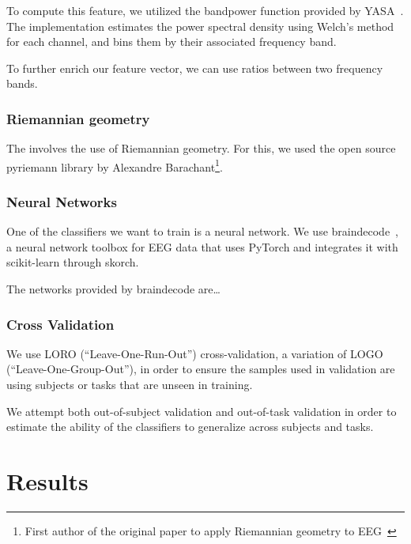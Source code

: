 \documentclass[a4paper]{article}
\begin{document}
\begin{refsection}
                To compute this feature, we utilized the bandpower function provided by YASA~\cite{raphael_vallat_raphaelvallatyasa_2020}. The implementation estimates the power spectral density using Welch's method for each channel, and bins them by their associated frequency band.

                To further enrich our feature vector, we can use ratios between two frequency bands.

            \subsubsection{Riemannian geometry}

                The  involves the use of Riemannian geometry. For this, we used the open source pyriemann library by Alexandre Barachant\footnote{First author of the original paper to apply Riemannian geometry to EEG~\cite{barachant_classification_2013}}.

        \subsubsection{Neural Networks}

            One of the classifiers we want to train is a neural network. We use braindecode~\cite{schirrmeister_deep_2017}\cite{noauthor_braindecodebraindecode_2021}, a neural network toolbox for EEG data that uses PyTorch and integrates it with scikit-learn through skorch.

            The networks provided by braindecode are\ldots

        \subsubsection{Cross Validation}

            We use LORO (``Leave-One-Run-Out'') cross-validation, a variation of LOGO (``Leave-One-Group-Out''), in order to ensure the samples used in validation are using subjects or tasks that are unseen in training.

            We attempt both out-of-subject validation and out-of-task validation in order to estimate the ability of the classifiers to generalize across subjects and tasks.



\section{Results}


\end{refsection}
\end{document}
